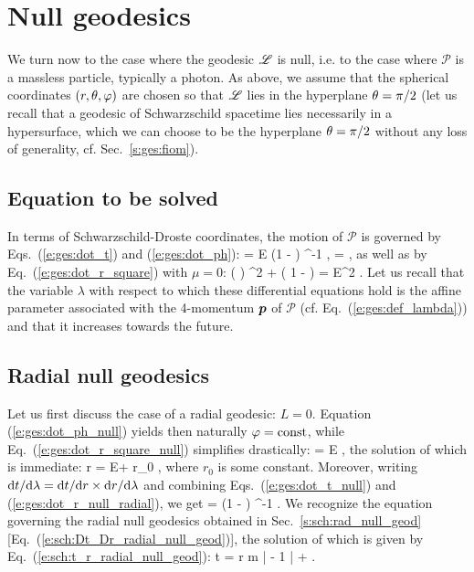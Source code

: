 \section{Null geodesics} \label{s:ges:null}


We turn now to the case where the geodesic $\mathscr{L}$ is null, i.e. to the case
where $\mathscr{P}$ is a massless particle, typically a photon.
As above, we assume that the spherical coordinates $(r,\theta,\varphi)$ are chosen
so that $\mathscr{L}$ lies in the hyperplane $\theta=\pi/2$ (let us recall that
a geodesic of Schwarzschild spacetime lies necessarily in a hypersurface, which
we can choose to be the hyperplane $\theta=\pi/2$ without any loss of generality,
cf. Sec.~\ref{s:ges:fiom}).

\subsection{Equation to be solved}

In terms of Schwarzschild-Droste coordinates, the motion of $\mathscr{P}$ is governed by Eqs.~(\ref{e:ges:dot_t}) and
(\ref{e:ges:dot_ph}):
\be \label{e:ges:dot_t_null}
    = E \left(1 -  \right) ^{-1} ,
\ee
\be \label{e:ges:dot_ph_null}
    \frac{\D\ph}{\D\lambda} =   ,
\ee
as well as by Eq.~(\ref{e:ges:dot_r_square}) with $\mu=0$:
\be \label{e:ges:dot_r_square_null}
    \left(  \right) ^2
         + 
         \left( 1 -  \right) = E^2 .
\ee
Let us recall that the variable $\lambda$ with respect to which these differential equations
hold
is the affine parameter associated with the 4-momentum $\bm{p}$ of $\mathscr{P}$
(cf. Eq.~(\ref{e:ges:def_lambda})) and that it increases towards the future.

\subsection{Radial null geodesics}

Let us first discuss the case of a radial geodesic: $L=0$.
Equation (\ref{e:ges:dot_ph_null}) yields then naturally $\varphi=\mathrm{const}$,
while Eq.~(\ref{e:ges:dot_r_square_null}) simplifies drastically:
\be \label{e:ges:dot_r_null_radial}
     = \pm E ,
\ee
the solution of which is immediate:
\be \label{e:ges:r_lambda_radial_null}
    r = \pm E\lambda + r_0 ,
\ee
where $r_0$ is some constant.
Moreover, writing $\mathrm{d} t/\mathrm{d}\lambda = \mathrm{d} t/\mathrm{d} r \times \mathrm{d} r/\mathrm{d}\lambda$
and combining Eqs.~(\ref{e:ges:dot_t_null}) and (\ref{e:ges:dot_r_null_radial}),
we get
\be
     = \pm \left(1 -  \right) ^{-1} .
\ee
We recognize the equation governing the radial null geodesics obtained in
Sec.~\ref{s:sch:rad_null_geod} [Eq.~(\ref{e:sch:Dt_Dr_radial_null_geod})],
the solution of which is given by Eq.~(\ref{e:sch:t_r_radial_null_geod}):
\be
    t = \pm r  m \ln \left|  - 1 \right| +  .
\ee


